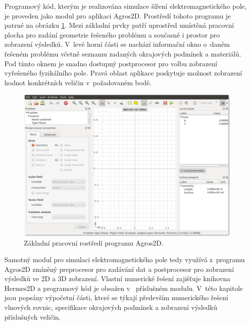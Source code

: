 Programový kód, kterým je realizována simulace šíření elektromagnetického pole, je proveden jako modul pro aplikaci Agros2D. Prostředí tohoto programu je patrné na obrázku \ref{obr:sim_agros2d}. Mezi základní prvky patří uprostřed umístěná pracovní plocha pro zadání geometrie řešeného problému a současně i prostor pro zobrazení výsledků. V~levé horní části se nachází informační okno o~daném řešeném problému včetně seznamu zadaných okrajových podmínek a materiálů. Pod tímto oknem je snadno dostupný postprocesor pro volbu zobrazení vyřešeného fyzikálního pole. Pravá oblast aplikace poskytuje možnost zobrazení hodnot konkrétních veličin v~požadovaném bodě.

\begin{figure}[!h]
	\centering
	\includegraphics[width=14cm]{sim_agros2d.png}
	\caption{Základní pracovní rostředí programu Agros2D.}
	\label{obr:sim_agros2d}
\end{figure}

Samotný modul pro simulaci elektromagnetického pole tedy využívá z~programu Agros2D zmíněný preprocesor pro zadávání dat a postprocesor pro zobrazení výsledků ve 2D a 3D zobrazení. Vlastní numerické řešení zajišťuje knihovna Hermes2D a programový kód je obsažen v~ příslušném modulu. V~této kapitole jsou popsány výpočetní části, které se týkají především numerického řešení vlnových rovnic, specifikace okrajových podmínek a zobrazení výsledků příslušných veličin.

